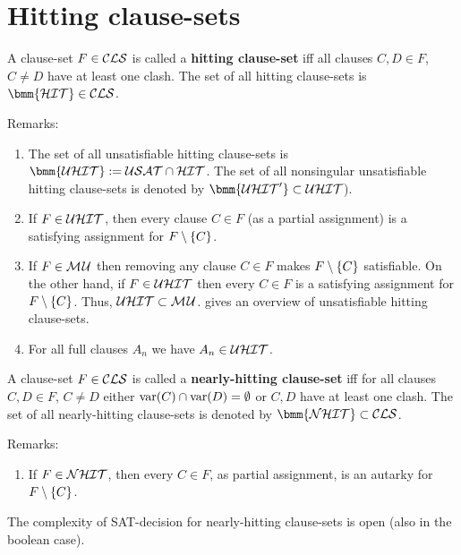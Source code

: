 \documentclass{report}
\begin{document}
\section{Hitting clause-sets}
\label{sec:hit}

\begin{defi}\label{def:hit-cls}
A clause-set $F \in \mathcal{CLS} $ is called a \textbf{hitting clause-set} iff all clauses $C,D \in F$, $C \not = D$ have at least one clash. The set of all hitting clause-sets is $\bmm{\Clash} \in \Cls$.
\end{defi}
Remarks:
  \begin{enumerate}
  \item The set of all unsatisfiable hitting clause-sets is $\bmm{\Uclash} := \Usat \cap \Clash$. The set of all nonsingular unsatisfiable hitting clause-sets is denoted by $\bmm{\Uclash'} \subset \Uclash$).
  \item If $F \in \mathcal{U}\mathcal{HIT}$, then every clause $C \in F$ (as a partial assignment) is a satisfying assignment for $F \setminus \{ C \}$.
  \item If $F \in \mathcal{M\hspace{0.8pt}U}$ then removing any clause $C \in F$ makes $F \setminus \{ C \}$ satisfiable. On the other hand, if $F \in \mathcal{U}\mathcal{HIT}$ then every $C \in F$ is a satisfying assignment for $F \setminus \{ C \}$. Thus, $\mathcal{U}\mathcal{HIT} \subset \mathcal{M\hspace{0.8pt}U}$. \cite{KullmannZhao2016UHitSAT} gives an overview of unsatisfiable hitting clause-sets.
  \item For all full clauses $A_n$ we have $A_n \in \mathcal{U}\mathcal{HIT}$.
  \end{enumerate}

 \begin{defi}\label{def:nhit-cls}
A clause-set $F \in \mathcal{CLS} $ is called a \textbf{nearly-hitting clause-set} iff for all clauses $C,D \in F$, $C \not = D$ either $\operatorname{var}(C) \cap \operatorname{var}(D) = \emptyset$ or $C,D$ have at least one clash. The set of all nearly-hitting clause-sets is denoted by $\bmm{\Nclash} \subset \Cls$.
\end{defi}
Remarks:
  \begin{enumerate}
  \item If $F \in \mathcal{NHIT}$, then every $C \in F$, as partial assignment, is an autarky for $F \setminus \{ C \}$.
  \end{enumerate}
  
\begin{quest}\label{ques:nhit-sat}
The complexity of SAT-decision for nearly-hitting clause-sets is open (also in the boolean case).
\end{quest}   
\end{document}
